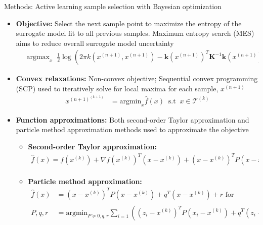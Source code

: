 \documentclass[final]{beamer}
\newlength{\colwidth}
\begin{document}
\begin{frame}[t]
\begin{columns}[t]
\begin{column}{\colwidth}
\begin{block}{Methods: Active learning sample selection with Bayesian optimization}
\begin{itemize}
      \item \textbf{Objective:} Select the next sample point to maximize the entropy of the surrogate model fit to all previous samples. Maximum entropy search (MES) aims to reduce overall surrogate model uncertainty
      \begin{align*}
        &\; \textrm{argmax}_x \;\; \frac{1}{2}\log(2\pi k(x^{(n+1)}, x^{(n+1)}) - \textbf{k}(x^{(n+1)})^T\textbf{K}^{-1}\textbf{k}(x^{(n+1)})) + \frac{1}{2} = \; \textrm{argmin}_x \textbf{k}(x)^T\textbf{K}^{-1}\textbf{k}(x)
    \end{align*}

      \item \textbf{Convex relaxations:} Non-convex objective; Sequential convex programming (SCP) used to iteratively solve for local maxima for each sample, $x^{(n+1)}$
    \begin{align*}
        x^{(n+1)^{(k+1)}} &= \textrm{argmin}_x \hat{f}(x) \;\; \textrm{s.t} \;\; x \in \mathcal{T}^{(k)}
    \end{align*}

    \item \textbf{Function approximations:} Both second-order Taylor approximation and particle method approximation methods used to approximate the objective
    \vspace{10}
      \begin{itemize}
      \item \textbf{Second-order Taylor approximation:}
      \begin{align*}
        \hat{f}(x) = f(x^{(k)}) + \nabla f(x^{(k)})^T(x - x^{(k)}) + (x - x^{(k)})^T P (x - x^{(k)}) \textrm{ for } P = \left(\nabla^2 f(x^{(k)})\right)_+
      \end{align*}
      \item \textbf{Particle method approximation:} 
      \begin{align*}
        \hat{f}(x) &= (x - x^{(k)})^TP(x - x^{(k)}) + q^T(x - x^{(k)}) + r \textrm{ for}\\
        P, q, r &= \textrm{argmin}_{P\succeq 0, q, r} \sum_{i=1} \left((z_i - x^{(k)})^TP(x_i - x^{(k)}) + q^T(z_i - x^{(k)}) + r - f(z_i)\right)^2 \textrm{, for } z_i \sim \text{Unif}\left[\mathcal{T}^{(k)}\right]
      \end{align*}
      \end{itemize}
    \end{itemize}
  \end{block}
  

\end{column}
\end{columns}
\end{frame}
\end{document}
